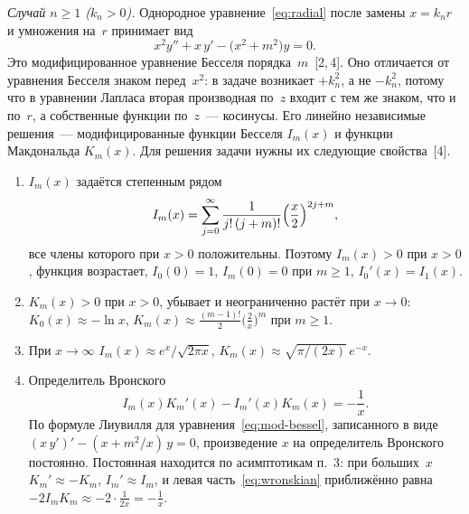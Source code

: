 \emph{Случай $n\ge1$ ($k_n>0$).} Однородное уравнение~\eqref{eq:radial}
после замены $x=k_n r$ и умножения на~$r$ принимает вид
\begin{equation}
\label{eq:mod-bessel}
x^2y''+x\,y'-\bigl(x^2+m^2\bigr)y=0 .
\end{equation}
Это модифицированное уравнение Бесселя порядка~$m$~[2,\,4]. Оно
отличается от уравнения Бесселя знаком перед~$x^2$: в задаче возникает
$+k_n^2$, а не $-k_n^2$, потому что в уравнении Лапласа вторая производная
по~$z$ входит с тем же знаком, что и по~$r$, а собственные функции по~$z$~—
косинусы. Его линейно независимые решения~— модифицированные функции
Бесселя $I_m(x)$ и функции Макдональда $K_m(x)$. Для решения задачи нужны
их следующие свойства~[4].
\begin{enumerate}
  \item $I_m(x)$ задаётся степенным рядом
        \begin{equation}
        \label{eq:I-series}
        I_m(x)=\sum_{j=0}^{\infty}\frac{1}{j!\,(j+m)!}
        \Bigl(\frac{x}{2}\Bigr)^{2j+m},
        \end{equation}
        все члены которого при $x>0$ положительны. Поэтому $I_m(x)>0$
        при $x>0$, функция возрастает, $I_0(0)=1$, $I_m(0)=0$ при $m\ge1$,
        $I_0'(x)=I_1(x)$.
  \item $K_m(x)>0$ при $x>0$, убывает и неограниченно растёт при
        $x\to0$: $K_0(x)\approx-\ln x$, $K_m(x)\approx
        \frac{(m-1)!}{2}\bigl(\frac{2}{x}\bigr)^m$ при $m\ge1$.
  \item При $x\to\infty$
        $I_m(x)\approx e^x/\sqrt{2\pi x}$,
        $K_m(x)\approx\sqrt{\pi/(2x)}\,e^{-x}$.
  \item Определитель Вронского
        \begin{equation}
        \label{eq:wronskian}
        I_m(x)K_m'(x)-I_m'(x)K_m(x)=-\frac{1}{x} .
        \end{equation}
        По формуле Лиувилля для уравнения~\eqref{eq:mod-bessel},
        записанного в виде $(x\,y')'-(x+m^2/x)\,y=0$, произведение $x$ на
        определитель Вронского постоянно. Постоянная находится по
        асимптотикам п.~3: при больших~$x$ $K_m'\approx-K_m$,
        $I_m'\approx I_m$, и левая часть~\eqref{eq:wronskian}
        приближённо равна $-2I_mK_m\approx-2\cdot\frac{1}{2x}=-\frac1x$.
\end{enumerate}

